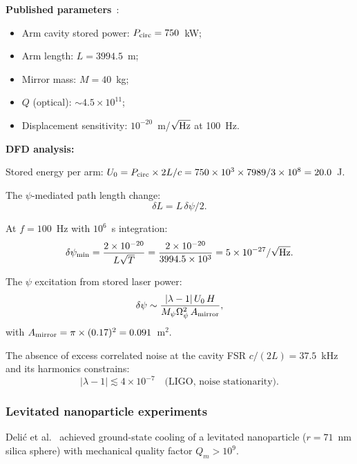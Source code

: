 \documentclass[12pt,aps,prd,twocolumn,superscriptaddress,nofootinbib]{revtex4-2}
\newcommand{\Opsi}{\Omega_\psi}
\newcommand{\Mpsi}{M_\psi}
\begin{document}
\textbf{Published parameters}~\cite{aLIGO2015}:
\begin{itemize}[noitemsep]
\item Arm cavity stored power: $P_{\rm circ} = 750$~kW;
\item Arm length: $L = 3994.5$~m;
\item Mirror mass: $M = 40$~kg;
\item $Q$ (optical): $\sim 4.5\times10^{11}$;
\item Displacement sensitivity: $10^{-20}$~m/$\sqrt{\rm Hz}$
at 100~Hz.
\end{itemize}

\textbf{DFD analysis:}

Stored energy per arm: $U_0 = P_{\rm circ}\times2L/c
= 750\times10^3\times7989/3\times10^8 = 20.0$~J.

The $\psi$-mediated path length change:
\begin{equation}
\delta L = L\,\delta\psi/2.
\label{eq:ligo_dL}
\end{equation}

At $f = 100$~Hz with $10^6$~s integration:
\begin{equation}
\delta\psi_{\rm min} = \frac{2\times10^{-20}}{L\sqrt{T}}
= \frac{2\times10^{-20}}{3994.5\times10^3}
= 5\times10^{-27}/\sqrt{\rm Hz}.
\label{eq:ligo_sensitivity}
\end{equation}

The $\psi$ excitation from stored laser power:
\begin{equation}
\delta\psi \sim \frac{|\lambda-1|\,U_0\,H}
{\Mpsi\Opsi^2\,A_{\rm mirror}},
\label{eq:ligo_psi}
\end{equation}
with $A_{\rm mirror} = \pi\times(0.17)^2 = 0.091$~m$^2$.

The absence of excess correlated noise at the cavity FSR
$c/(2L) = 37.5$~kHz and its harmonics constrains:
\begin{equation}
|\lambda-1| \lesssim 4\times10^{-7}
\quad\text{(LIGO, noise stationarity)}.
\label{eq:ligo_bound}
\end{equation}

\subsubsection{Levitated nanoparticle experiments}
\label{sec:nanoparticle}

Deli\'c et al.~\cite{Delic2020} achieved ground-state cooling of
a levitated nanoparticle ($r = 71$~nm silica sphere) with mechanical
quality factor $Q_m > 10^9$.
\end{document}
